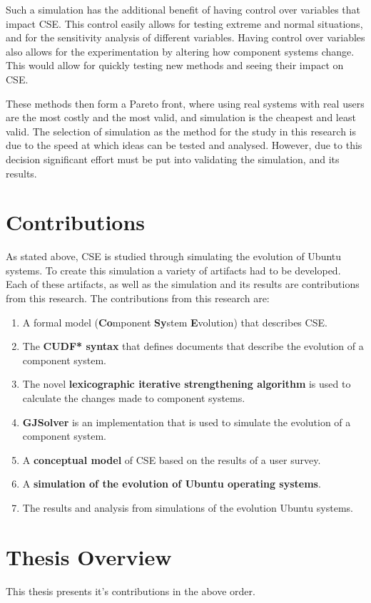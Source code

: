 Such a simulation has the additional benefit of having control over variables that impact CSE.
This control easily allows for testing extreme and normal situations,
and for the sensitivity analysis of different variables.
Having control over variables also allows for the experimentation by altering how component systems change.
This would allow for quickly testing new methods and seeing their impact on CSE.

These methods then form a Pareto front, where using real systems with real users are the most costly and the most valid, 
and simulation is the cheapest and least valid.
The selection of simulation as the method for the study in this research is due to the speed at which ideas can be tested and analysed.
However, due to this decision significant effort must be put into validating the simulation, and its results. 

\section{Contributions}
As stated above, CSE is studied through simulating the evolution of Ubuntu systems.
To create this simulation a variety of artifacts had to be developed.
Each of these artifacts, as well as the simulation and its results are contributions from this research. 
The contributions from this research are:
\begin{enumerate}
  \item A formal model \textbf{\modelname} (\textbf{Co}mponent \textbf{Sy}stem \textbf{E}volution) that describes CSE. 
  \item The \textbf{CUDF* syntax} that defines documents that describe the evolution of a component system.
  \item The novel \textbf{lexicographic iterative strengthening algorithm} is used to calculate the changes made to component systems.
  \item \textbf{GJSolver} is an implementation that is used to simulate the evolution of a component system.
  \item A \textbf{conceptual model} of CSE based on the results of a user survey. 
  \item A \textbf{simulation of the evolution of Ubuntu operating systems}.
  \item The results and analysis from simulations of the evolution Ubuntu systems.
\end{enumerate}

\section{Thesis Overview}
This thesis presents it's contributions in the above order.

